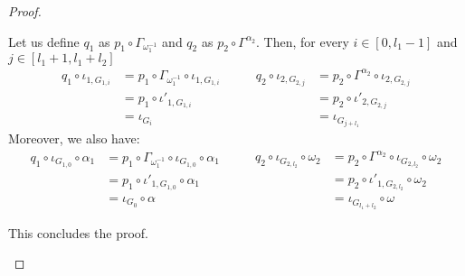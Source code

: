 \begin{proof}
\begin{itemize}
		Let us define $q_1$ as $p_1\circ \Gamma_{\omega^{-1}_1}$ and $q_2$ as $p_2\circ \Gamma^{\alpha_2}$. Then, for every $i\in [0,l_1-1]$ and $j\in [l_1+1, l_1+l_2]$
		\[\begin{split}
			q_1\circ \iota_{1, G_{1,i}}&=p_1\circ \Gamma_{\omega^{-1}_1}\circ \iota_{1, G_{1,i}}\\&=p_1\circ \iota'_{1, G_{1,i}} \\&=\iota_{G_{i}}
		\end{split} \qquad \begin{split}
			q_2\circ \iota_{2, G_{2,j}}&=p_2\circ \Gamma^{\alpha_2}\circ \iota_{2, G_{2,j}}\\&=p_2\circ \iota'_{2, G_{2,j}} \\&=\iota_{G_{j+l_1}}
		\end{split}\]
		Moreover, we also have:
		\[
		\begin{split}
			q_1\circ \iota_{G_{1,0}}\circ \alpha_1&= p_1\circ \Gamma_{\omega^{-1}_1}\circ \iota_{G_{1,0}}\circ \alpha_1 \\&=p_1\circ \iota'_{1, G_{1,0}} \circ \alpha_1 \\&= \iota_{G_{0}}\circ \alpha
		\end{split}\qquad 
		\begin{split}
			q_2\circ \iota_{G_{2,l_2}}\circ \omega_2&= p_2\circ \Gamma^{\alpha_2}\circ \iota_{G_{2,l_2}}\circ \omega_2 \\&=p_2\circ \iota'_{1, G_{2,l_2}} \circ \omega_2 \\&= \iota_{G_{l_1+l_2}}\circ \omega
		\end{split} \] 
		
		This concludes the proof. \qedhere
	\end{itemize}	
\end{proof}


